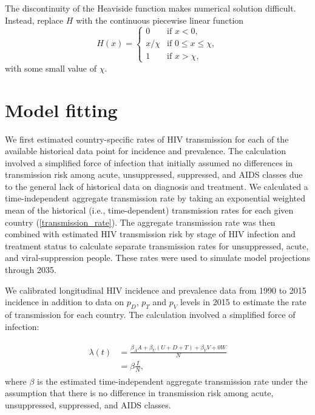 \documentclass[11pt]{article}
\begin{document}
The discontinuity of the Heaviside function makes numerical solution
difficult.  Instead, replace $H$ with the continuous piecewise linear
function
\begin{equation}
  H(x) =
  \begin{cases}
    0 & \text{if $x < 0$},
    \\
    x / \chi & \text{if $0 \leq x \leq \chi$},
    \\
    1 & \text{if $x > \chi$},
  \end{cases}
\end{equation}
with some small value of $\chi$.


\section{Model fitting}
\label{model_fitting}
We first estimated country-specific rates of HIV transmission for each
of the available historical data point for incidence and
prevalence. The calculation involved a simplified force of infection
that initially assumed no differences in transmission risk among
acute, unsuppressed, suppressed, and AIDS classes due to the general
lack of historical data on diagnosis and treatment. We calculated a
time-independent aggregate transmission rate by taking an exponential
weighted mean of the historical (i.e., time-dependent) transmission
rates for each given country (\autoref{transmission_rate}). The
aggregate transmission rate was then combined with estimated HIV
transmission risk by stage of HIV infection
\cite{Hollingsworth2008-iy} and treatment status \cite{Wawer2005-us}
to calculate separate transmission rates for unsuppressed, acute, and
viral-suppression people. These rates were used to simulate model
projections through 2035.



{We calibrated longitudinal HIV incidence and prevalence data from
  1990 to 2015 incidence in addition to data on $p_{D}$, $p_{T}$ and
  $p_{V}$ levels in 2015 to estimate the rate of transmission for each
  country. The calculation involved a simplified force of infection:}

\begin{align}
  \label{foi}
  \begin{split}
  \lambda(t) &  =    \frac{\beta_{A} A + \beta_{U}(U+D+T)+\beta_{V}V+0
               W}{N} \\
             &  =  \beta \frac{I}{N},
             \end{split}
\end{align}
where $\beta$ is the estimated time-independent aggregate transmission rate under the
assumption that there is no difference in transmission risk among acute, unsuppressed, suppressed, and AIDS classes.
\end{document}
